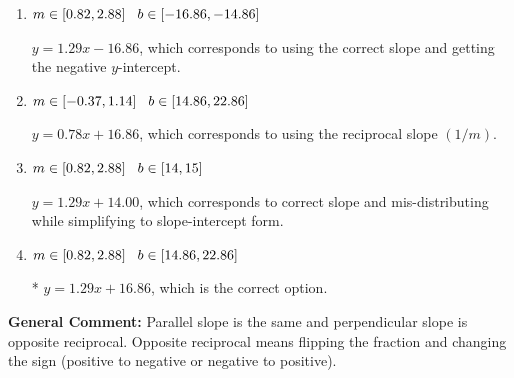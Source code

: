 \documentclass{extbook}[14pt]
\begin{document}
\begin{enumerate}
{\begin{enumerate}[label=\Alph*.]
 $y = -1.29x - 8.86$, which corresponds to using the negative slope.
\item \( m \in [0.82, 2.88] \hspace*{3mm} b \in [-16.86, -14.86] \)

 $y = 1.29x - 16.86$, which corresponds to using the correct slope and getting the negative $y$-intercept.
\item \( m \in [-0.37, 1.14] \hspace*{3mm} b \in [14.86, 22.86] \)

 $y = 0.78x + 16.86$, which corresponds to using the reciprocal slope $(1/m)$.
\item \( m \in [0.82, 2.88] \hspace*{3mm} b \in [14, 15] \)

 $y = 1.29x + 14.00$, which corresponds to correct slope and mis-distributing while simplifying to slope-intercept form.
\item \( m \in [0.82, 2.88] \hspace*{3mm} b \in [14.86, 22.86] \)

* $y = 1.29x + 16.86$, which is the correct option.
\end{enumerate}

\textbf{General Comment:} Parallel slope is the same and perpendicular slope is opposite reciprocal. Opposite reciprocal means flipping the fraction and changing the sign (positive to negative or negative to positive).
}
\end{enumerate}
\end{document}
